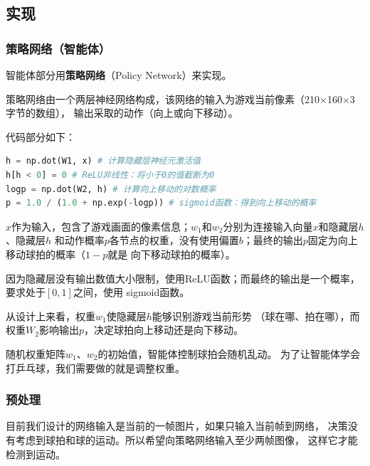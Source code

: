 

\subsection{实现}

\subsubsection{策略网络（智能体）}

智能体部分用\textbf{策略网络}（Policy Network）来实现。

策略网络由一个两层神经网络构成，该网络的输入为游戏当前像素（210×160×3字节的数组），
输出采取的动作（向上或向下移动）。



代码部分如下：

\begin{lstlisting}[language=Python, aboveskip=\baselineskip, belowskip=\baselineskip]
h = np.dot(W1, x) # 计算隐藏层神经元激活值
h[h < 0] = 0 # ReLU非线性：将小于0的值截断为0
logp = np.dot(W2, h) # 计算向上移动的对数概率
p = 1.0 / (1.0 + np.exp(-logp)) # sigmoid函数：得到向上移动的概率
\end{lstlisting}

$x$作为输入，包含了游戏画面的像素信息；$w_1$和$w_2$分别为连接输入向量$x$和隐藏层$h$、隐藏层$h$
和动作概率$p$各节点的权重，没有使用偏置$b$；最终的输出$p$固定为向上移动球拍的概率（$1 - p$就是
向下移动球拍的概率）。

因为隐藏层没有输出数值大小限制，使用ReLU函数；而最终的输出是一个概率，要求处于$[0,1]$之间，使用
sigmoid函数。



从设计上来看，权重$w_1$使隐藏层$h$能够识别游戏当前形势
（球在哪、拍在哪），而权重$W_2$影响输出$p$，决定球拍向上移动还是向下移动。

随机权重矩阵$w_1$、$w_2$的初始值，智能体控制球拍会随机乱动。
为了让智能体学会打乒乓球，我们需要做的就是调整权重。

\subsubsection{预处理}

目前我们设计的网络输入是当前的一帧图片，如果只输入当前帧到网络，
决策没有考虑到球拍和球的运动。所以希望向策略网络输入至少两帧图像，
这样它才能检测到运动。

